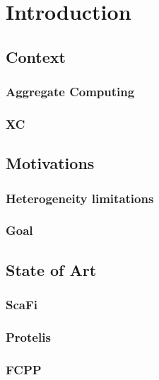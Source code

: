 
\chapter{Introduction}
\label{chap:introduction}
\section{Context}
\subsection{Aggregate Computing}
\subsection{XC}

\section{Motivations}
\subsection{Heterogeneity limitations}
\subsection{Goal}

\section{State of Art}
\subsection{ScaFi}
\subsection{Protelis}
\subsection{FCPP}



%
%
%
%
%
